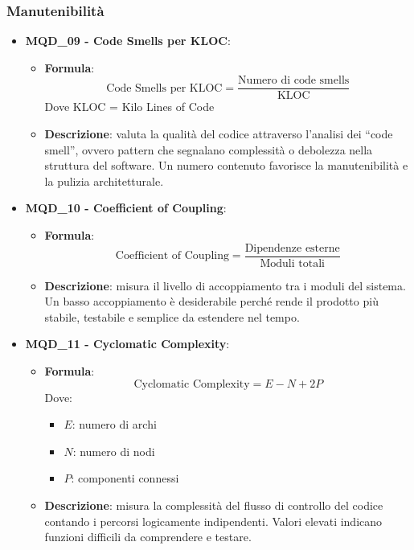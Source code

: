 \subsubsection{Manutenibilità}
\begin{itemize}
\item \textbf{MQD\_09 - Code Smells per KLOC}:
    \begin{itemize}
        \item \textbf{Formula}:
        \[
            \text{Code Smells per KLOC} =
            \frac{\text{Numero di code smells}}{\text{KLOC}}
        \]
        Dove KLOC = Kilo Lines of Code
        \item \textbf{Descrizione}: valuta la qualità del codice attraverso l’analisi dei “code smell”, ovvero pattern che segnalano complessità o debolezza nella struttura del software. Un numero contenuto favorisce la manutenibilità e la pulizia architetturale.
    \end{itemize}

\item \textbf{MQD\_10 - Coefficient of Coupling}:
    \begin{itemize}
        \item \textbf{Formula}:
        \[
            \text{Coefficient of Coupling} =
            \frac{\text{Dipendenze esterne}}{\text{Moduli totali}}
        \]
        \item \textbf{Descrizione}: misura il livello di accoppiamento tra i moduli del sistema. Un basso accoppiamento è desiderabile perché rende il prodotto più stabile, testabile e semplice da estendere nel tempo.
    \end{itemize}

\item \textbf{MQD\_11 - Cyclomatic Complexity}:
    \begin{itemize}
        \item \textbf{Formula}:
        \[
            \text{Cyclomatic Complexity} = E - N + 2P
        \]
        Dove:
        \begin{itemize}
            \item $E$: numero di archi
            \item $N$: numero di nodi
            \item $P$: componenti connessi
        \end{itemize}
        \item \textbf{Descrizione}: misura la complessità del flusso di controllo del codice contando i percorsi logicamente indipendenti. Valori elevati indicano funzioni difficili da comprendere e testare.
    \end{itemize}
\end{itemize}